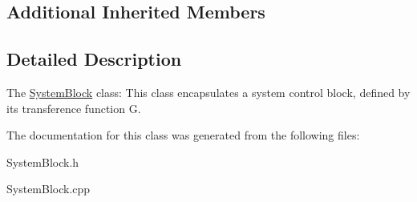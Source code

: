 \subsection*{Additional Inherited Members}


\subsection{Detailed Description}
The \hyperlink{classSystemBlock}{System\+Block} class\+: This class encapsulates a system control block, defined by its transference function G.

The documentation for this class was generated from the following files\+:\begin{DoxyCompactItemize}
\item 
System\+Block.\+h\item 
System\+Block.\+cpp\end{DoxyCompactItemize}
